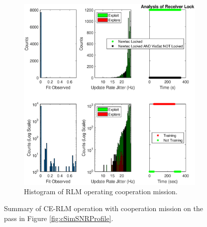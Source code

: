 \begin{figure}[ht!]
\begin{subfigure}{\linewidth}
	\includegraphics[scale=0.5]{figures/c_sim_results/sim22_RLM_hists_coop.eps}
	\caption{Histogram of RLM operating cooperation mission.}
	\label{fig:cSimLMHists}
\end{subfigure}
\caption{Summary of CE-RLM operation with cooperation mission on the pass in Figure \ref{fig:cSimSNRProfile}.}
\label{fig:c22RLMCoop}
\end{figure}
